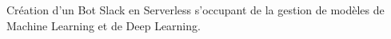 Création d’un Bot Slack en Serverless s’occupant de la gestion de modèles de Machine Learning et de Deep Learning.

\sectionspace
